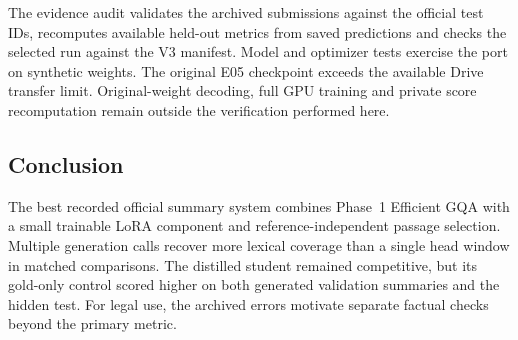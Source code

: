 The evidence audit validates the archived submissions against the official
test IDs, recomputes available held-out metrics from saved predictions and
checks the selected run against the V3 manifest. Model and optimizer tests
exercise the port on synthetic weights. The original E05 checkpoint exceeds
the available Drive transfer limit. Original-weight decoding, full GPU
training and private score recomputation remain outside the verification
performed here.

\subsection{Conclusion}
The best recorded official summary system combines Phase~1 Efficient GQA
with a small trainable LoRA component and reference-independent passage
selection. Multiple generation calls recover more lexical coverage than a
single head window in matched comparisons. The distilled student remained
competitive, but its gold-only control scored higher on both generated
validation summaries and the hidden test. For legal use, the archived
errors motivate separate factual checks beyond the primary metric.
